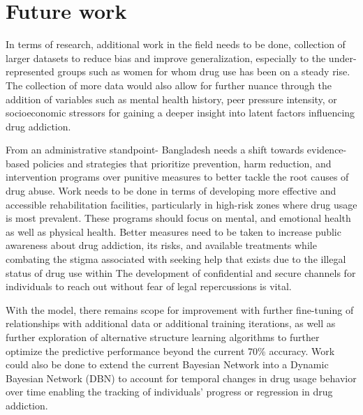 \documentclass[conference]{IEEEtran}
\begin{document}
\section{Future work}
In terms of research, additional work in the field needs to be done, collection of larger datasets to reduce bias and improve generalization, especially to the under-represented groups such as women for whom drug use has been on a steady rise. The collection of more data would also allow for further nuance through the addition of variables such as mental health history, peer pressure intensity, or socioeconomic stressors for gaining a deeper insight into latent factors influencing drug addiction.

From an administrative standpoint- Bangladesh needs a shift towards evidence-based policies and strategies that prioritize prevention, harm reduction, and intervention programs over punitive measures to better tackle the root causes of drug abuse. Work needs to be done in terms of developing more effective and accessible rehabilitation facilities, particularly in high-risk zones where drug usage is most prevalent. These programs should focus on mental, and emotional health as well as physical health. Better measures need to be taken to increase public awareness about drug addiction, its risks, and available treatments while combating the stigma associated with seeking help that exists due to the illegal status of drug use within The development of confidential and secure channels for individuals to reach out without fear of legal repercussions is vital.

With the model, there remains scope for improvement with further fine-tuning of relationships with additional data or additional training iterations, as well as further exploration of alternative structure learning algorithms to further optimize the predictive performance beyond the current 70\% accuracy. Work could also be done to extend the current Bayesian Network into a Dynamic Bayesian Network (DBN) to account for temporal changes in drug usage behavior over time enabling the tracking of individuals’ progress or regression in drug addiction.





\end{document}
